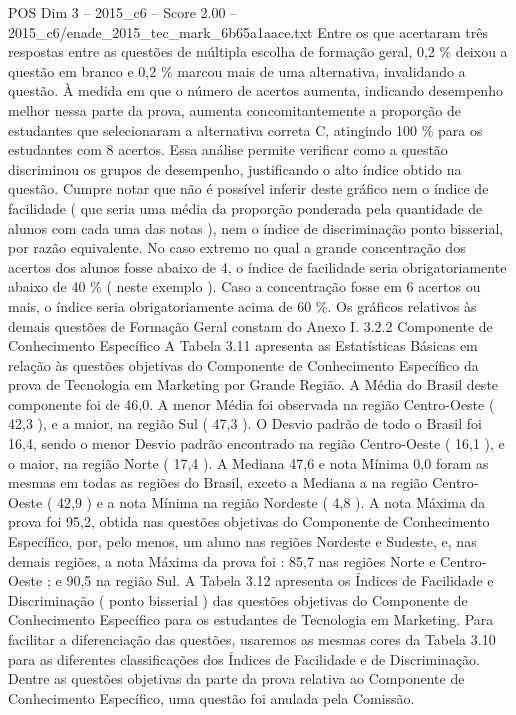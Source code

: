 \begin{textsample}{POS Dim 3 – 2015\_c6 – Score 2.00 – 2015\_c6/enade\_2015\_tec\_mark\_6b65a1aace.txt}
Entre os que acertaram três respostas entre as questões de múltipla escolha de formação geral, 0,2 \% deixou a questão em branco e 0,2 \% marcou mais de uma alternativa, invalidando a questão.
À medida em que o número de acertos aumenta, indicando desempenho melhor nessa parte da prova, aumenta concomitantemente a proporção de estudantes que selecionaram a alternativa correta C, atingindo 100 \% para os estudantes com 8 acertos.
Essa análise permite verificar como a questão discriminou os grupos de desempenho, justificando o alto índice obtido na questão.
Cumpre notar que não é possível inferir deste gráfico nem o índice de facilidade ( que seria uma média da proporção ponderada pela quantidade de alunos com cada uma das notas ), nem o índice de discriminação ponto bisserial, por razão equivalente.
No caso extremo no qual a grande concentração dos acertos dos alunos fosse abaixo de 4, o índice de facilidade seria obrigatoriamente abaixo de 40 \% ( neste exemplo ).
Caso a concentração fosse em 6 acertos ou mais, o índice seria obrigatoriamente acima de 60 \%.
Os gráficos relativos às demais questões de Formação Geral constam do Anexo I. 3.2.2 Componente de Conhecimento Específico A Tabela 3.11 apresenta as Estatísticas Básicas em relação às questões objetivas do Componente de Conhecimento Específico da prova de Tecnologia em Marketing por Grande Região.
A Média do Brasil deste componente foi de 46,0.
A menor Média foi observada na região Centro-Oeste ( 42,3 ), e a maior, na região Sul ( 47,3 ).
O Desvio padrão de todo o Brasil foi 16,4, sendo o menor Desvio padrão encontrado na região Centro-Oeste ( 16,1 ), e o maior, na região Norte ( 17,4 ).
A Mediana 47,6 e nota Mínima 0,0 foram as mesmas em todas as regiões do Brasil, exceto a Mediana a na região Centro-Oeste ( 42,9 ) e a nota Mínima na região Nordeste ( 4,8 ).
A nota Máxima da prova foi 95,2, obtida nas questões objetivas do Componente de Conhecimento Específico, por, pelo menos, um aluno nas regiões Nordeste e Sudeste, e, nas demais regiões, a nota Máxima da prova foi : 85,7 nas regiões Norte e Centro-Oeste ; e 90,5 na região Sul.
A Tabela 3.12 apresenta os Índices de Facilidade e Discriminação ( ponto bisserial ) das questões objetivas do Componente de Conhecimento Específico para os estudantes de Tecnologia em Marketing.
Para facilitar a diferenciação das questões, usaremos as mesmas cores da Tabela 3.10 para as diferentes classificações dos Índices de Facilidade e de Discriminação.
Dentre as questões objetivas da parte da prova relativa ao Componente de Conhecimento Específico, uma questão foi anulada pela Comissão.

\end{textsample}
